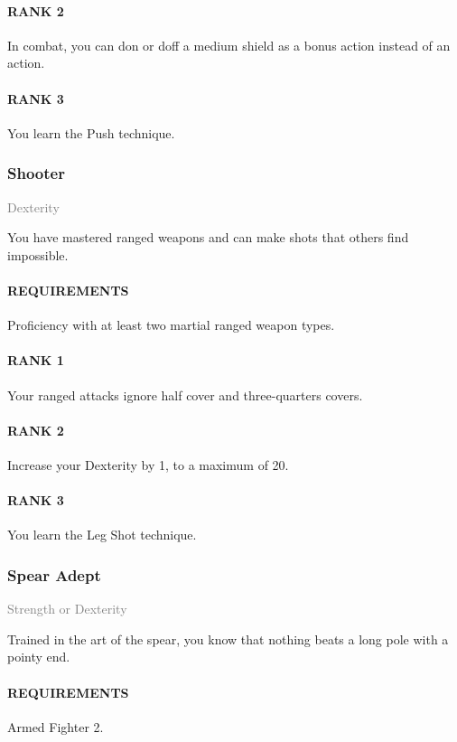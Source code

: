 \paragraph{RANK 2} In combat, you can don or doff a medium shield as a bonus action instead of an action.
\paragraph{RANK 3} You learn the Push technique.

\subsubsection{Shooter} \label{feat::shooter}
\small{\textcolor{gray}{Dexterity}}

\normalsize
You have mastered ranged weapons and can make shots that others find impossible.
\paragraph{REQUIREMENTS} Proficiency with at least two martial ranged weapon types.
\paragraph{RANK 1} Your ranged attacks ignore half cover and three-quarters covers.
\paragraph{RANK 2} Increase your Dexterity by 1, to a maximum of 20.
\paragraph{RANK 3} You learn the Leg Shot technique.

\subsubsection{Spear Adept} \label{feat::spearadept}
\small{\textcolor{gray}{Strength or Dexterity}}

\normalsize
Trained in the art of the spear, you know that nothing beats a long pole with a pointy end.
\paragraph{REQUIREMENTS} Armed Fighter 2.
